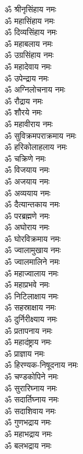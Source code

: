 \begin{center}
\begin{multicols}{2}\setlength{\columnseprule}{1pt}
\begin{flushleft}
ॐ श्रीनृसिंहाय नमः\\
ॐ महासिंहाय नमः\\
ॐ दिव्यसिंहाय नमः\\
ॐ महाबलाय नमः\\
ॐ उग्रसिंहाय नमः\\
ॐ महादेवाय नमः\\
ॐ उपेन्द्राय नमः\\
ॐ अग्निलोचनाय नमः\\
ॐ रौद्राय नमः\\
ॐ शौरये नमः\hfill{}\\
ॐ महावीराय नमः\\
ॐ सुविक्रमपराक्रमाय नमः\\
ॐ हरिकोलाहलाय नमः\\
ॐ चक्रिणे नमः\\
ॐ विजयाय नमः\\
ॐ अजयाय नमः\\
ॐ अव्ययाय नमः\\
ॐ दैत्यान्तकाय नमः\\
ॐ परब्रह्मणे नमः\\
ॐ अघोराय नमः\hfill{}\\
ॐ घोरविक्रमाय नमः\\
ॐ ज्वालामुखाय नमः\\
ॐ ज्वालमालिने नमः\\
ॐ महाज्वालाय नमः\\
ॐ महाप्रभवे नमः\\
ॐ निटिलाक्षाय नमः\\
ॐ सहस्राक्षाय नमः\\
ॐ दुर्निरीक्ष्याय नमः\\
ॐ प्रतापनाय नमः\\
ॐ महादंष्ट्राय नमः\hfill{}\\
ॐ प्राज्ञाय नमः\\
ॐ हिरण्यक-निषूदनाय नमः\\
ॐ चण्डकोपिने नमः\\
ॐ सुरारिघ्नाय नमः\\
ॐ सदार्तिघ्नाय नमः\\
ॐ सदाशिवाय नमः\\
ॐ गुणभद्राय नमः\\
ॐ महाभद्राय नमः\\
ॐ बलभद्राय नमः\\

\end{flushleft}
\end{multicols}
\end{center}

